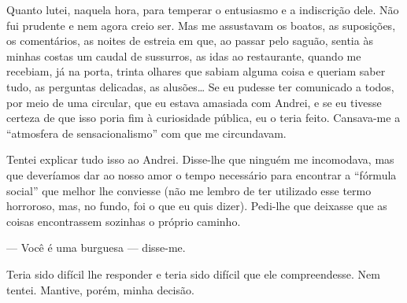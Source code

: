 Quanto lutei, naquela hora, para temperar o entusiasmo e a indiscrição
dele. Não fui prudente e nem agora creio ser. Mas me assustavam os
boatos, as suposições, os comentários, as noites de estreia em que, ao
passar pelo saguão, sentia às minhas costas um caudal de sussurros, as
idas ao restaurante, quando me recebiam, já na porta, trinta olhares que
sabiam alguma coisa e queriam saber tudo, as perguntas delicadas, as
alusões\ldots{} Se eu pudesse ter comunicado a todos, por meio de uma
circular, que eu estava amasiada com Andrei, e se eu tivesse certeza de que
isso poria fim à curiosidade pública, eu o teria feito. Cansava-me a
``atmosfera de sensacionalismo'' com que me circundavam.

Tentei explicar tudo isso ao Andrei. Disse-lhe que ninguém me
incomodava, mas que deveríamos dar ao nosso amor o tempo necessário para
encontrar a ``fórmula social'' que melhor lhe conviesse (não me lembro
de ter utilizado esse termo horroroso, mas, no fundo, foi o que eu quis
dizer). Pedi-lhe que deixasse que as coisas encontrassem sozinhas o
próprio caminho.

--- Você é uma burguesa --- disse-me.




Teria sido difícil lhe responder e teria sido difícil que ele
compreendesse. Nem tentei. Mantive, porém, minha decisão.


